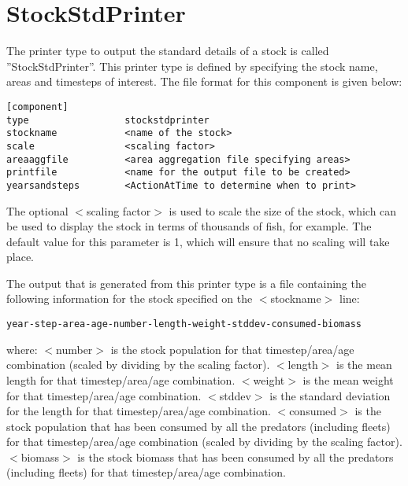 \documentclass [a4paper, 10pt]{book}
\begin{document}
\newpage
\section{StockStdPrinter}\label{sec:stockstdprinter}
The printer type to output the standard details of a stock is called ''StockStdPrinter''.  This printer type is defined by specifying the stock name, areas and timesteps of interest.  The file format for this component is given below:

{\small\begin{verbatim}
[component]
type                 stockstdprinter
stockname            <name of the stock>
scale                <scaling factor>
areaaggfile          <area aggregation file specifying areas>
printfile            <name for the output file to be created>
yearsandsteps        <ActionAtTime to determine when to print>
\end{verbatim}}

The optional $<$scaling factor$>$ is used to scale the size of the stock, which can be used to display the stock in terms of thousands of fish, for example.  The default value for this parameter is 1, which will ensure that no scaling will take place.

\bigskip
The output that is generated from this printer type is a file containing the following information for the stock specified on the $<$stockname$>$ line:

{\small\begin{verbatim}
year-step-area-age-number-length-weight-stddev-consumed-biomass
\end{verbatim}}

where:\newline
$<$number$>$ is the stock population for that timestep/area/age combination (scaled by dividing by the scaling factor).\newline
$<$length$>$ is the mean length for that timestep/area/age combination.\newline
$<$weight$>$ is the mean weight for that timestep/area/age combination.\newline
$<$stddev$>$ is the standard deviation for the length for that timestep/area/age combination.\newline
$<$consumed$>$ is the stock population that has been consumed by all the predators (including fleets) for that timestep/area/age combination (scaled by dividing by the scaling factor).\newline
$<$biomass$>$ is the stock biomass that has been consumed by all the predators (including fleets) for that timestep/area/age combination.
\end{document}

